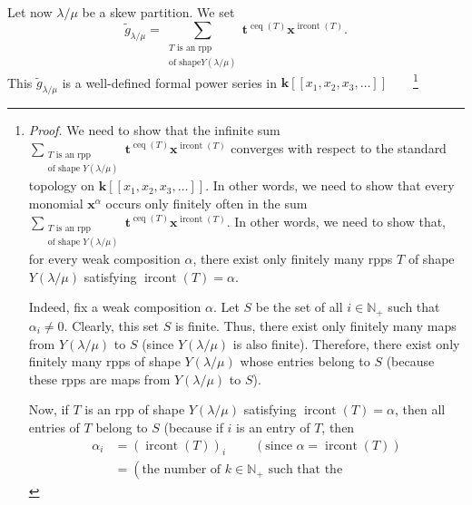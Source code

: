 \documentclass[numbers=enddot,12pt,final,onecolumn,notitlepage]{scrartcl}%
\theoremstyle{definition}
\newenvironment{verlong}{}{}
\let\sumnonlimits\sum
\renewcommand{\sum}{\sumnonlimits\limits}
\begin{document}
\begin{verlong}
Let now $\lambda/\mu$ be a skew partition. We set%
\[
\widetilde{g}_{\lambda/\mu}=\sum_{\substack{T\text{ is an rpp}\\\text{of shape
}Y\left(  \lambda/\mu\right)  }}\mathbf{t}^{\operatorname*{ceq}\left(
T\right)  }\mathbf{x}^{\operatorname*{ircont}\left(  T\right)  }.
\]
This $\widetilde{g}_{\lambda/\mu}$ is a well-defined formal power series in
$\mathbf{k}\left[  \left[  x_{1},x_{2},x_{3},\ldots\right]  \right]
$\ \ \ \ \footnote{\textit{Proof.} We need to show that the infinite sum
$\sum_{\substack{T\text{ is an rpp}\\\text{of shape }Y\left(  \lambda
/\mu\right)  }}\mathbf{t}^{\operatorname*{ceq}\left(  T\right)  }%
\mathbf{x}^{\operatorname*{ircont}\left(  T\right)  }$ converges with respect
to the standard topology on $\mathbf{k}\left[  \left[  x_{1},x_{2}%
,x_{3},\ldots\right]  \right]  $. In other words, we need to show that every
monomial $\mathbf{x}^{\alpha}$ occurs only finitely often in the sum
$\sum_{\substack{T\text{ is an rpp}\\\text{of shape }Y\left(  \lambda
/\mu\right)  }}\mathbf{t}^{\operatorname*{ceq}\left(  T\right)  }%
\mathbf{x}^{\operatorname*{ircont}\left(  T\right)  }$. In other words, we
need to show that, for every weak composition $\alpha$, there exist only
finitely many rpps $T$ of shape $Y\left(  \lambda/\mu\right)  $ satisfying
$\operatorname*{ircont}\left(  T\right)  =\alpha$.
\par
Indeed, fix a weak composition $\alpha$. Let $S$ be the set of all
$i\in\mathbb{N}_{+}$ such that $\alpha_{i}\neq0$. Clearly, this set $S$ is
finite. Thus, there exist only finitely many maps from $Y\left(  \lambda
/\mu\right)  $ to $S$ (since $Y\left(  \lambda/\mu\right)  $ is also finite).
Therefore, there exist only finitely many rpps of shape $Y\left(  \lambda
/\mu\right)  $ whose entries belong to $S$ (because these rpps are maps from
$Y\left(  \lambda/\mu\right)  $ to $S$).
\par
Now, if $T$ is an rpp of shape $Y\left(  \lambda/\mu\right)  $ satisfying
$\operatorname*{ircont}\left(  T\right)  =\alpha$, then all entries of $T$
belong to $S$ (because if $i$ is an entry of $T$, then%
\begin{align*}
\alpha_{i}  &  =\left(  \operatorname*{ircont}\left(  T\right)  \right)
_{i}\ \ \ \ \ \ \ \ \ \ \left(  \text{since }\alpha=\operatorname*{ircont}%
\left(  T\right)  \right) \\
&  =\left(  \text{the number of }k\in\mathbb{N}_{+}\text{ such that the
}
\end{align*}}
\end{verlong}
\end{document}

